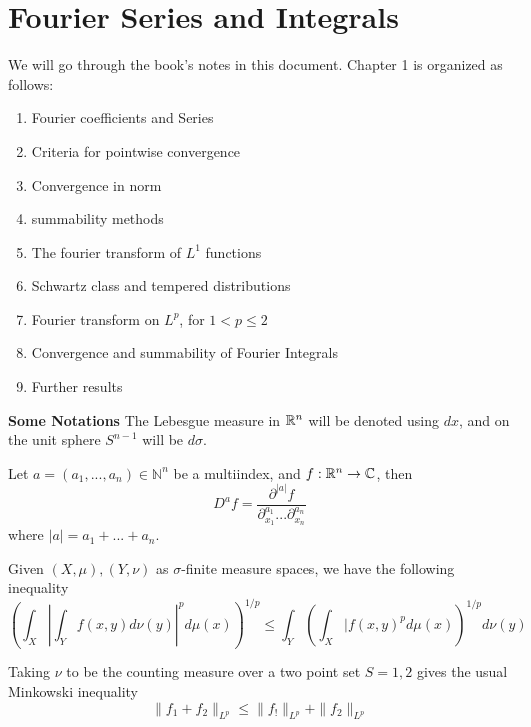 \chapter{Fourier Series and Integrals}

We will go through the book's notes in this document.
Chapter 1 is organized as follows:
\begin{enumerate}
    \item Fourier coefficients and Series
    \item Criteria for pointwise convergence
    \item Convergence in norm
    \item summability methods
    \item The fourier transform of $L^1$ functions
    \item Schwartz class and tempered distributions
    \item Fourier transform on $L^p$, for $1<p\leq 2$
    \item Convergence and summability of Fourier Integrals
    \item Further results
\end{enumerate}

\textbf{Some Notations}
The Lebesgue measure in $\mathbb{R}^n$ will be denoted using $dx$, and on the unit sphere $S^{n-1}$ will be $d\sigma$.

Let $a=(a_1, ..., a_n)\in\mathbb{N}^n$ be a multiindex, and $f:\mathbb{R}^n\to\mathbb{C}$, then
\begin{equation*}
    D^af=\frac{\partial^{|a|}f}{\partial_{x_1}^{a_1}...\partial_{x_n}^{a_n}}
\end{equation*}
where $|a|=a_1+...+a_n$.


\begin{theorem}
    Given $(X,\mu), (Y,\nu)$ as $\sigma$-finite measure spaces, we have the following inequality
    \begin{equation*}
        \left(\int_X\left|\int_Yf(x,y)d\nu(y) \right|^pd\mu(x) \right)^{1/p}\leq\int_Y \left(\int_X|f(x,y)^pd\mu(x) \right)^{1/p}d\nu(y)
    \end{equation*}
\end{theorem}

Taking $\nu$ to be the counting measure over a two point set $S={1,2}$ gives the usual Minkowski inequality
\begin{equation*}
    \|f_1+f_2\|_{L^p}\leq\|f_!\|_{L^p}+\|f_2\|_{L^p}
\end{equation*}

